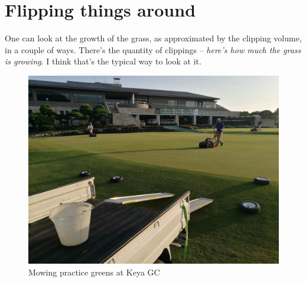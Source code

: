 \documentclass[12pt,b5,]{tufte-book}
\begin{document}
\hypertarget{flipping-things-around}{%
\chapter{Flipping things around}\label{flipping-things-around}}

One can look at the growth of the grass, as approximated by the clipping volume, in a couple of ways. There's the quantity of clippings -- \emph{here's how much the grass is growing}. I think that's the typical way to look at it.

\begin{figure}
\centering
\includegraphics{img/b7-1.jpg}
\caption{Mowing practice greens at Keya GC}
\end{figure}
\end{document}
